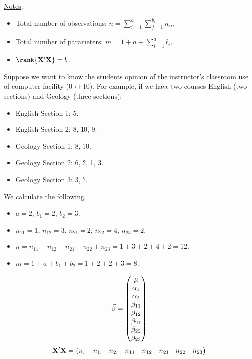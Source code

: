 \underline{Notes}:
\begin{itemize}
    \item Total number of observations: $ n=\sum_{i=1}^{a}\sum_{j=1}^{b_i}n_{ij} $.
    \item Total number of parameters: $ m=1+a+\sum_{i=1}^{a}b_i $.
    \item $ \rank{\Matrix{X}'\Matrix{X}}=b $.
\end{itemize}
\begin{Example}{}{}
    Suppose we want to know the students opinion of the instructor's
    classroom use of computer facility ($ 0\leftrightarrow 10 $).
    For example, if we have two courses English (two sections) and Geology (three sections):
    \begin{itemize}
        \item English Section 1: 5.
        \item English Section 2: 8, 10, 9.
        \item Geology Section 1: 8, 10.
        \item Geology Section 2: 6, 2, 1, 3.
        \item Geology Section 3: 3, 7.
    \end{itemize}
    We calculate the following.
    \begin{itemize}
        \item $ a=2 $, $ b_1=2 $, $ b_2=3 $.
        \item $ n_{11}=1 $, $ n_{12}=3 $, $ n_{21}=2 $, $ n_{22}=4 $, $ n_{23}=2 $.
        \item $ n=n_{11}+n_{12}+n_{21}+n_{22}+n_{23}=1+3+2+4+2=12 $.
        \item $ m=1+a+b_1+b_2=1+2+2+3=8 $.
    \end{itemize}
    \[ \vec{\beta}=\begin{pmatrix}
            \mu        \\
            \alpha_1   \\
            \alpha_2   \\
            \beta_{11} \\
            \beta_{12} \\
            \beta_{21} \\
            \beta_{22} \\
            \beta_{23}
        \end{pmatrix} \]
    \[ \mathbf{X}'\mathbf{X}=\begin{pmatrix}
            n_{..} & n_{1.} & n_{2.} & n_{11} & n_{12} & n_{21} & n_{22} & n_{23} \\

\end{pmatrix}\]
\end{Example}
